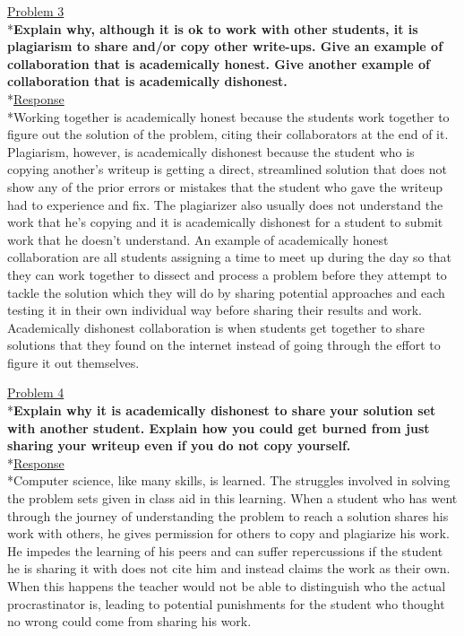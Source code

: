 \documentclass[11pt]{article}
\begin{document}
\bigskip\bigskip

\noindent
\uline{Problem 3}
\\*\textbf{Explain why, although it is ok to work with other students, it is plagiarism to share and/or copy other write-ups.  Give an example of collaboration that is academically honest. Give another example of collaboration that is academically dishonest.}
\medskip
\\*\uline{Response}
\\*Working together is academically honest because the students work together to figure out the solution of the problem, citing their collaborators at the end of it. Plagiarism, however, is academically dishonest because the student who is copying another's writeup is getting a direct, streamlined solution that does not show any of the prior errors or mistakes that the student who gave the writeup had to experience and fix. The plagiarizer also usually does not understand the work that he's copying and it is academically dishonest for a student to submit work that he doesn't understand. An example of academically honest collaboration are all students assigning a time to meet up during the day so that they can work together to dissect and process a problem before they attempt to tackle the solution which they will do by sharing potential approaches and each testing it in their own individual way before sharing their results and work. Academically dishonest collaboration is when students get together to share solutions that they found on the internet instead of going through the effort to figure it out themselves. 
\bigskip\bigskip

\noindent
\uline{Problem 4}
\\*\textbf{Explain why it is academically dishonest to share your solution set with another student.  Explain how you could get burned from just sharing your writeup even if you do not copy yourself.}
\medskip
\\*\uline{Response}
\\*Computer science, like many skills, is learned. The struggles involved in solving the problem sets given in class aid in this learning. When a student who has went through the journey of understanding the problem to reach a solution shares his work with others, he gives permission for others to copy and plagiarize his work. He impedes the learning of his peers and can suffer repercussions if the student he is sharing it with does not cite him and instead claims the work as their own. When this happens the teacher would not be able to distinguish who the actual procrastinator is, leading to potential punishments for the student who thought no wrong could come from sharing his work. 
\bigskip\bigskip
\end{document}
